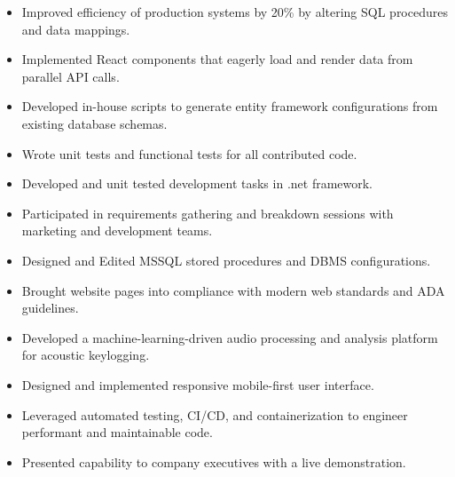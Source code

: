 \documentclass[10pt,a4paper,ragged2e,withhyper]{altacv}
\begin{document}
\medskip
\medskip
\medskip
\medskip
\medskip



\smallskip
{}

\begin{itemize}
\item Improved efficiency of production systems by 20\% by altering SQL procedures and data mappings.
\item Implemented React components that eagerly load and render data from parallel API calls.
\item Developed in-house scripts to generate entity framework configurations from existing database schemas.
\item Wrote unit tests and functional tests for all contributed code.
\end{itemize}

\divider

\begin{itemize}
\item Developed and unit tested development tasks in .net framework.
\item Participated in requirements gathering and breakdown sessions with marketing and development teams.
\item Designed and Edited MSSQL stored procedures and DBMS configurations.
\item Brought website pages into compliance with modern web standards and ADA guidelines.
\end{itemize}

\divider{}

\begin{itemize}
\item Developed a machine-learning-driven audio processing and analysis platform for acoustic keylogging.
\item Designed and implemented responsive mobile-first user interface.
\item Leveraged automated testing, CI/CD, and containerization to engineer performant and maintainable code.
\item Presented capability to company executives with a live demonstration.
\end{itemize}
\end{document}

